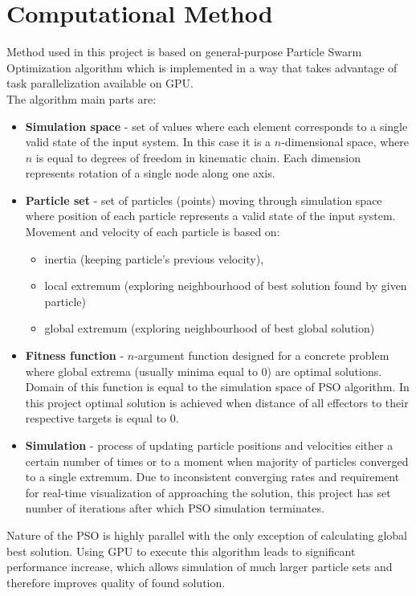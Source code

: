\documentclass[]{report}
\begin{document}
\chapter*{Computational Method}
Method used in this project is based on general-purpose Particle Swarm Optimization algorithm which is implemented in a way that takes advantage of task parallelization available on GPU.\\

\noindent The algorithm main parts are:

\begin{itemize}
	\item \textbf{Simulation space} - set of values where each element corresponds to a single valid state of the input system. In this case it is a $n$-dimensional space, where $n$ is equal to degrees of freedom in kinematic chain. Each dimension represents rotation of a single node along one axis.
	\item \textbf{Particle set} - set of particles (points) moving through simulation space where position of each particle represents a valid state of the input system. Movement and velocity of each particle is based on: 
	\begin{itemize}
		\item inertia (keeping particle's previous velocity),
		\item local extremum (exploring neighbourhood of best solution found by given particle)
		\item global extremum (exploring neighbourhood of best global solution)
	\end{itemize}
	\item \textbf{Fitness function} - $n$-argument function designed for a concrete problem where global extrema (usually minima equal to 0) are optimal solutions. Domain of this function is equal to the simulation space of PSO algorithm. In this project optimal solution is achieved when distance of all effectors to their respective targets is equal to 0.
	\item \textbf{Simulation} - process of updating particle positions and velocities either a certain number of times or to a moment when majority of particles converged to a single extremum. Due to inconsistent converging rates and requirement for real-time visualization of approaching the solution, this project has set number of iterations after which PSO simulation terminates.
\end{itemize}

\noindent Nature of the PSO is highly parallel with the only exception of calculating global best solution. Using GPU to execute this algorithm leads to significant performance increase, which allows simulation of much larger particle sets and therefore improves quality of found solution.\\
\end{document}
